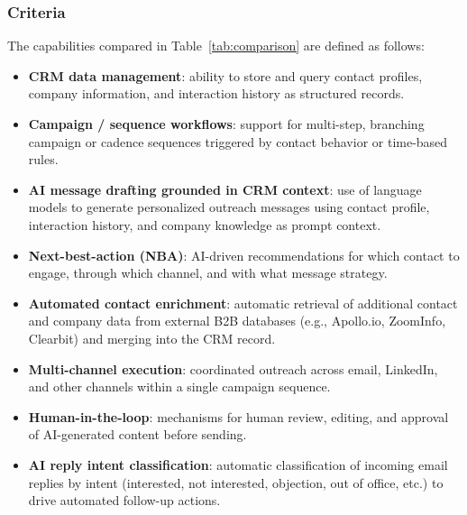\documentclass[a4paper]{article}
\begin{document}
\subsubsection{Criteria} The capabilities compared in 
Table~\ref{tab:comparison} are defined as follows:

\begin{itemize}
  \item \textbf{CRM data management}: ability to store and query 
    contact profiles, company information, and interaction history 
    as structured records.
  \item \textbf{Campaign / sequence workflows}: support for 
    multi-step, branching campaign or cadence sequences triggered by 
    contact behavior or time-based rules.
  \item \textbf{AI message drafting grounded in CRM context}: use 
    of language models to generate personalized outreach messages 
    using contact profile, interaction history, and company 
    knowledge as prompt context.
  \item \textbf{Next-best-action (NBA)}: AI-driven recommendations 
    for which contact to engage, through which channel, and with 
    what message strategy.
  \item \textbf{Automated contact enrichment}: automatic retrieval 
    of additional contact and company data from external B2B 
    databases (e.g., Apollo.io, ZoomInfo, Clearbit) and merging 
    into the CRM record.
  \item \textbf{Multi-channel execution}: coordinated outreach 
    across email, LinkedIn, and other channels within a single 
    campaign sequence.
  \item \textbf{Human-in-the-loop}: mechanisms for human review, 
    editing, and approval of AI-generated content before sending.
  \item \textbf{AI reply intent classification}: automatic 
    classification of incoming email replies by intent (interested, 
    not interested, objection, out of office, etc.) to drive 
    automated follow-up actions.
\end{itemize}
\end{document}
